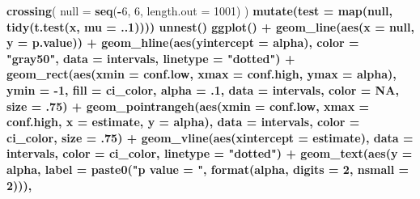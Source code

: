 \documentclass[]{book}
\newenvironment{Shaded}{\begin{snugshade}}{\end{snugshade}}
\newcommand{\DataTypeTok}[1]{\textcolor[rgb]{0.13,0.29,0.53}{#1}}
\newcommand{\DecValTok}[1]{\textcolor[rgb]{0.00,0.00,0.81}{#1}}
\newcommand{\FloatTok}[1]{\textcolor[rgb]{0.00,0.00,0.81}{#1}}
\newcommand{\KeywordTok}[1]{\textcolor[rgb]{0.13,0.29,0.53}{\textbf{#1}}}
\newcommand{\NormalTok}[1]{#1}
\newcommand{\OperatorTok}[1]{\textcolor[rgb]{0.81,0.36,0.00}{\textbf{#1}}}
\newcommand{\OtherTok}[1]{\textcolor[rgb]{0.56,0.35,0.01}{#1}}
\newcommand{\StringTok}[1]{\textcolor[rgb]{0.31,0.60,0.02}{#1}}
\theoremstyle{definition}
\theoremstyle{definition}
\theoremstyle{definition}
\theoremstyle{remark}
\begin{document}
\begin{Shaded}
\begin{Highlighting}[]
{\KeywordTok{crossing}\NormalTok{(}
    \DataTypeTok{null =} \KeywordTok{seq}\NormalTok{(}\OperatorTok{-}\DecValTok{6}\NormalTok{, }\DecValTok{6}\NormalTok{, }\DataTypeTok{length.out =} \DecValTok{1001}\NormalTok{)}
\NormalTok{  ) }\OperatorTok{%>%}
\StringTok{  }\KeywordTok{mutate}\NormalTok{(}\DataTypeTok{test =} \KeywordTok{map}\NormalTok{(null, }\OperatorTok{~}\StringTok{ }\KeywordTok{tidy}\NormalTok{(}\KeywordTok{t.test}\NormalTok{(x, }\DataTypeTok{mu =}\NormalTok{ ..}\DecValTok{1}\NormalTok{)))) }\OperatorTok{%>%}
\StringTok{  }\KeywordTok{unnest}\NormalTok{() }\OperatorTok{%>%}
\StringTok{  }\KeywordTok{ggplot}\NormalTok{() }\OperatorTok{+}
\StringTok{  }\KeywordTok{geom_line}\NormalTok{(}\KeywordTok{aes}\NormalTok{(}\DataTypeTok{x =}\NormalTok{ null, }\DataTypeTok{y =}\NormalTok{ p.value)) }\OperatorTok{+}
\StringTok{  }\KeywordTok{geom_hline}\NormalTok{(}\KeywordTok{aes}\NormalTok{(}\DataTypeTok{yintercept =}\NormalTok{ alpha), }\DataTypeTok{color =} \StringTok{"gray50"}\NormalTok{, }\DataTypeTok{data =}\NormalTok{ intervals, }\DataTypeTok{linetype =} \StringTok{"dotted"}\NormalTok{) }\OperatorTok{+}
\StringTok{  }\KeywordTok{geom_rect}\NormalTok{(}\KeywordTok{aes}\NormalTok{(}\DataTypeTok{xmin =}\NormalTok{ conf.low, }\DataTypeTok{xmax =}\NormalTok{ conf.high, }\DataTypeTok{ymax =}\NormalTok{ alpha), }\DataTypeTok{ymin =} \DecValTok{-1}\NormalTok{, }\DataTypeTok{fill =}\NormalTok{ ci_color, }\DataTypeTok{alpha =} \FloatTok{.1}\NormalTok{,}
    \DataTypeTok{data =}\NormalTok{ intervals, }\DataTypeTok{color =} \OtherTok{NA}\NormalTok{, }\DataTypeTok{size =} \FloatTok{.75}\NormalTok{) }\OperatorTok{+}
\StringTok{  }\KeywordTok{geom_pointrangeh}\NormalTok{(}\KeywordTok{aes}\NormalTok{(}\DataTypeTok{xmin =}\NormalTok{ conf.low, }\DataTypeTok{xmax =}\NormalTok{ conf.high, }\DataTypeTok{x =}\NormalTok{ estimate, }\DataTypeTok{y =}\NormalTok{ alpha), }
    \DataTypeTok{data =}\NormalTok{ intervals, }\DataTypeTok{color =}\NormalTok{ ci_color, }\DataTypeTok{size =} \FloatTok{.75}\NormalTok{) }\OperatorTok{+}
\StringTok{  }\KeywordTok{geom_vline}\NormalTok{(}\KeywordTok{aes}\NormalTok{(}\DataTypeTok{xintercept =}\NormalTok{ estimate), }\DataTypeTok{data =}\NormalTok{ intervals, }\DataTypeTok{color =}\NormalTok{ ci_color, }\DataTypeTok{linetype =} \StringTok{"dotted"}\NormalTok{) }\OperatorTok{+}
\StringTok{  }\KeywordTok{geom_text}\NormalTok{(}\KeywordTok{aes}\NormalTok{(}\DataTypeTok{y =}\NormalTok{ alpha, }\DataTypeTok{label =} \KeywordTok{paste0}\NormalTok{(}\StringTok{"p value = "}\NormalTok{, }\KeywordTok{format}\NormalTok{(alpha, }\DataTypeTok{digits =} \DecValTok{2}\NormalTok{, }\DataTypeTok{nsmall =} \DecValTok{2}\NormalTok{))),}
}}}}
\end{Highlighting}
\end{Shaded}
\end{document}
